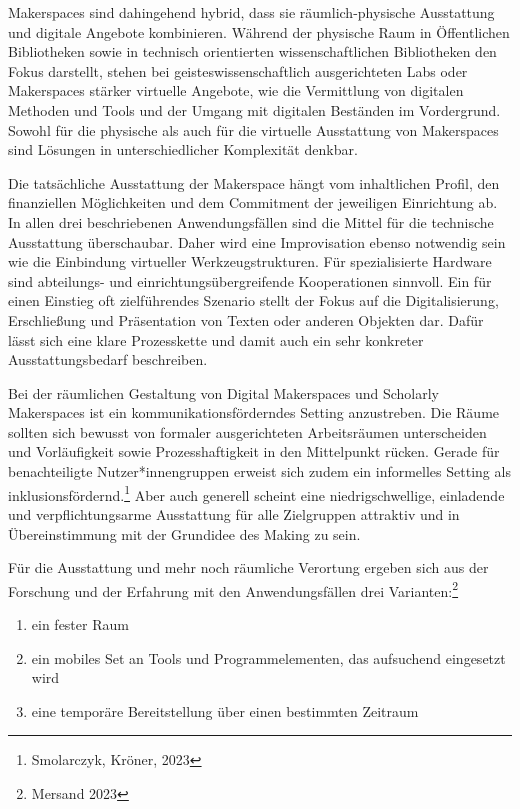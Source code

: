 \documentclass[a4paper,
fontsize=11pt,
oneside,
numbers=noperiodatend,
parskip=half-,
bibliography=totoc,
final
]{scrartcl}
\begin{document}
Makerspaces sind dahingehend hybrid, dass sie räumlich-physische
Ausstattung und digitale Angebote kombinieren. Während der physische
Raum in Öffentlichen Bibliotheken sowie in technisch orientierten
wissenschaftlichen Bibliotheken den Fokus darstellt, stehen bei
geisteswissenschaftlich ausgerichteten Labs oder Makerspaces stärker
virtuelle Angebote, wie die Vermittlung von digitalen Methoden und Tools
und der Umgang mit digitalen Beständen im Vordergrund. Sowohl für die
physische als auch für die virtuelle Ausstattung von Makerspaces sind
Lösungen in unterschiedlicher Komplexität denkbar.

Die tatsächliche Ausstattung der Makerspace hängt vom inhaltlichen
Profil, den finanziellen Möglichkeiten und dem Commitment der jeweiligen
Einrichtung ab. In allen drei beschriebenen Anwendungsfällen sind die
Mittel für die technische Ausstattung überschaubar. Daher wird eine
Improvisation ebenso notwendig sein wie die Einbindung virtueller
Werkzeugstrukturen. Für spezialisierte Hardware sind abteilungs- und
einrichtungsübergreifende Kooperationen sinnvoll. Ein für einen Einstieg
oft zielführendes Szenario stellt der Fokus auf die Digitalisierung,
Erschließung und Präsentation von Texten oder anderen Objekten dar.
Dafür lässt sich eine klare Prozesskette und damit auch ein sehr
konkreter Ausstattungsbedarf beschreiben.

Bei der räumlichen Gestaltung von Digital Makerspaces und Scholarly
Makerspaces ist ein kommunikationsförderndes Setting anzustreben. Die
Räume sollten sich bewusst von formaler ausgerichteten Arbeitsräumen
unterscheiden und Vorläufigkeit sowie Prozesshaftigkeit in den
Mittelpunkt rücken. Gerade für benachteiligte Nutzer*innengruppen
erweist sich zudem ein informelles Setting als
inklusionsfördernd.\footnote{Smolarczyk, Kröner, 2023} Aber auch
generell scheint eine niedrigschwellige, einladende und
verpflichtungsarme Ausstattung für alle Zielgruppen attraktiv und in
Übereinstimmung mit der Grundidee des Making zu sein.

Für die Ausstattung und mehr noch räumliche Verortung ergeben sich aus
der Forschung und der Erfahrung mit den Anwendungsfällen drei
Varianten:\footnote{Mersand 2023}

\begin{enumerate}
\def\labelenumi{\arabic{enumi}.}
\item
  ein fester Raum
\item
  ein mobiles Set an Tools und Programmelementen, das aufsuchend
  eingesetzt wird
\item
  eine temporäre Bereitstellung über einen bestimmten Zeitraum
\end{enumerate}
\end{document}
